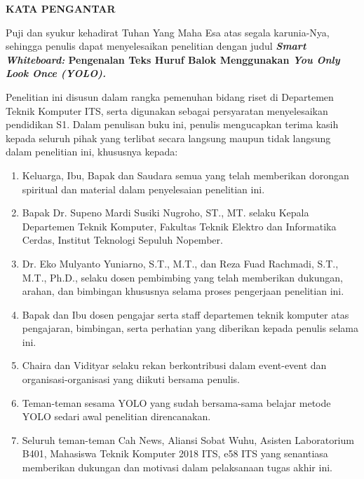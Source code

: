 \begin{center}
  \Large
  \textbf{KATA PENGANTAR}
\end{center}


\vspace{2ex}


Puji dan syukur kehadirat Tuhan Yang Maha Esa atas segala karunia-Nya, sehingga penulis dapat menyelesaikan penelitian dengan judul \textbf{\textit{Smart Whiteboard:} Pengenalan Teks Huruf Balok Menggunakan \textit{You Only Look Once (YOLO).}}

Penelitian ini disusun dalam rangka pemenuhan bidang riset di Departemen Teknik Komputer ITS, serta digunakan sebagai persyaratan menyelesaikan pendidikan S1. Dalam penulisan buku ini, penulis mengucapkan terima kasih kepada seluruh pihak yang terlibat secara langsung maupun tidak langsung dalam penelitian ini, khususnya kepada:

\begin{enumerate}[nolistsep]

  \item Keluarga, Ibu, Bapak dan Saudara semua yang telah memberikan dorongan spiritual dan material dalam penyelesaian penelitian ini.

  \item Bapak Dr. Supeno Mardi Susiki Nugroho, ST., MT. selaku Kepala Departemen Teknik Komputer, Fakultas Teknik Elektro dan Informatika Cerdas, Institut Teknologi Sepuluh Nopember.

  \item Dr. Eko Mulyanto Yuniarno, S.T., M.T., dan Reza Fuad Rachmadi, S.T., M.T., Ph.D., selaku dosen pembimbing yang telah memberikan dukungan, arahan, dan bimbingan khususnya selama proses pengerjaan penelitian ini.
  
  \item Bapak dan Ibu dosen pengajar serta staff departemen teknik komputer atas pengajaran, bimbingan, serta perhatian yang diberikan kepada penulis selama ini.
  
  \item Chaira dan Vidityar selaku rekan berkontribusi dalam event-event dan organisasi-organisasi yang diikuti bersama penulis.
  
  \item Teman-teman sesama YOLO yang sudah bersama-sama belajar metode YOLO sedari awal penelitian direncanakan.

  \item Seluruh teman-teman Cah News, Aliansi Sobat Wuhu, Asisten Laboratorium B401, Mahasiswa Teknik Komputer 2018 ITS, e58 ITS yang senantiasa memberikan dukungan dan motivasi dalam pelaksanaan tugas akhir ini.

\end{enumerate}

